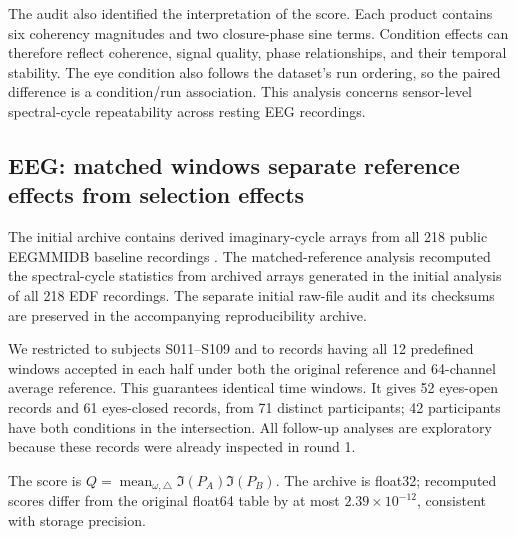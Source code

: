 \documentclass[11pt,a4paper]{article}
\begin{document}
The audit also identified the interpretation of the score. Each product contains six coherency magnitudes and two closure-phase sine terms. Condition effects can therefore reflect coherence, signal quality, phase relationships, and their temporal stability. The eye condition also follows the dataset's run ordering, so the paired difference is a condition/run association. This analysis concerns sensor-level spectral-cycle repeatability across resting EEG recordings.

\subsection{EEG: matched windows separate reference effects from selection effects}

The initial archive contains derived imaginary-cycle arrays from all 218 public EEGMMIDB baseline recordings \cite{schalk2009}. The matched-reference analysis recomputed the spectral-cycle statistics from archived arrays generated in the initial analysis of all 218 EDF recordings. The separate initial raw-file audit and its checksums are preserved in the accompanying reproducibility archive.

We restricted to subjects S011--S109 and to records having all 12 predefined windows accepted in each half under both the original reference and 64-channel average reference. This guarantees identical time windows. It gives 52 eyes-open records and 61 eyes-closed records, from 71 distinct participants; 42 participants have both conditions in the intersection. All follow-up analyses are exploratory because these records were already inspected in round 1.

The score is \(Q=\operatorname{mean}_{\omega,\triangle}\Im(P_A)\Im(P_B)\). The archive is float32; recomputed scores differ from the original float64 table by at most \(2.39\times10^{-12}\), consistent with storage precision.
\end{document}
